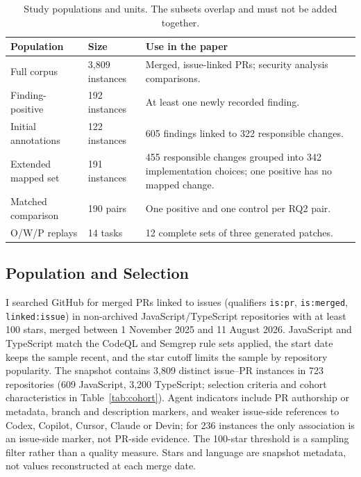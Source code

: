 \documentclass[acmsmall,screen,nonacm,review]{acmart}
\begin{document}
\begin{table}[H]
\caption{Study populations and units. The subsets overlap and must not be added together.}
\label{tab:population-guide}
\footnotesize\renewcommand{\arraystretch}{1.10}
\begin{tabularx}{\linewidth}{@{}L{2.65cm}L{2.2cm}Y@{}}
\toprule
\textbf{Population} & \textbf{Size} & \textbf{Use in the paper}\\
\midrule
Full corpus & 3,809 instances & Merged, issue-linked PRs; security analysis comparisons.\\
Finding-positive & 192 instances & At least one newly recorded finding.\\
Initial annotations & 122 instances & 605 findings linked to 322 responsible changes.\\
Extended mapped set & 191 instances & 455 responsible changes grouped into 342 implementation choices; one positive has no mapped change.\\
Matched comparison & 190 pairs & One positive and one control per RQ2 pair.\\
O/W/P replays & 14 tasks & 12 complete sets of three generated patches.\\
\bottomrule
\end{tabularx}
\end{table}



\subsection{Population and Selection}

I searched GitHub for merged PRs linked to issues (qualifiers \texttt{is:pr}, \texttt{is:merged}, \texttt{linked:issue}) in non-archived JavaScript/\allowbreak TypeScript repositories with at least 100 stars, merged between 1 November 2025 and 11 August 2026. JavaScript and TypeScript match the CodeQL and Semgrep rule sets applied, the start date keeps the sample recent, and the star cutoff limits the sample by repository popularity. The snapshot contains 3,809 distinct issue--PR instances in 723 repositories (609 JavaScript, 3,200 TypeScript; selection criteria and cohort characteristics in Table~\ref{tab:cohort}). Agent indicators include PR authorship or metadata, branch and description markers, and weaker issue-side references to Codex, Copilot, Cursor, Claude or Devin; for 236 instances the only association is an issue-side marker, not PR-side evidence. The 100-star threshold is a sampling filter rather than a quality measure. Stars and language are snapshot metadata, not values reconstructed at each merge date.
\end{document}
